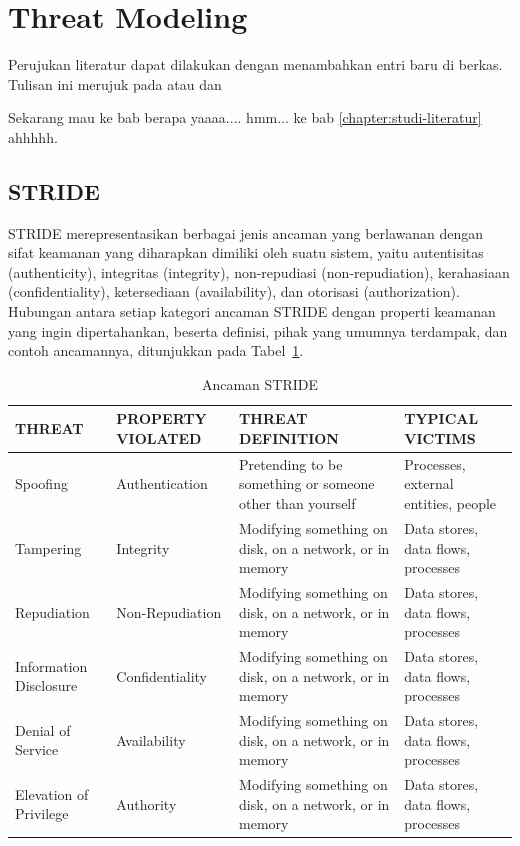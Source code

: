 \section{Threat Modeling}
Perujukan literatur dapat dilakukan dengan menambahkan entri baru di berkas. Tulisan ini merujuk pada \parencite{vasp1} atau \parencite{codingame2021media} dan \parencite{4026885}

Sekarang mau ke bab berapa yaaaa.... hmm... ke bab \ref{chapter:studi-literatur} ahhhhh.


\subsection{STRIDE}
\label{subsec:stride}
STRIDE merepresentasikan berbagai jenis ancaman yang berlawanan dengan sifat keamanan yang diharapkan dimiliki oleh suatu sistem, yaitu autentisitas (authenticity), integritas (integrity), non-repudiasi (non-repudiation), kerahasiaan (confidentiality), ketersediaan (availability), dan otorisasi (authorization). Hubungan antara setiap kategori ancaman STRIDE dengan properti keamanan yang ingin dipertahankan, beserta definisi, pihak yang umumnya terdampak, dan contoh ancamannya, ditunjukkan pada Tabel~\ref{tab:stride}.

\begin{table}[htbp]
    \centering
    \caption{Ancaman STRIDE}
    \label{tab:stride}
    \begin{tabular}{|p{2cm}|p{2.5cm}|p{4cm}|p{4cm}||}
        \hline
        \textbf{THREAT} & \textbf{PROPERTY VIOLATED} & \textbf{THREAT DEFINITION} & \textbf{TYPICAL VICTIMS} \\
        \hline
        Spoofing & Authentication & Pretending to be something or someone other than yourself & Processes, external entities, people \\
        \hline
        Tampering & Integrity & Modifying something on disk, on a network, or in memory & Data stores, data flows, processes  \\
        \hline
		Repudiation & Non-Repudiation & Modifying something on disk, on a network, or in memory & Data stores, data flows, processes  \\
        \hline
		Information Disclosure & Confidentiality & Modifying something on disk, on a network, or in memory & Data stores, data flows, processes  \\
        \hline
		Denial of Service & Availability & Modifying something on disk, on a network, or in memory & Data stores, data flows, processes  \\
        \hline
		Elevation of Privilege & Authority & Modifying something on disk, on a network, or in memory & Data stores, data flows, processes  \\
        \hline
    \end{tabular}
\end{table}


